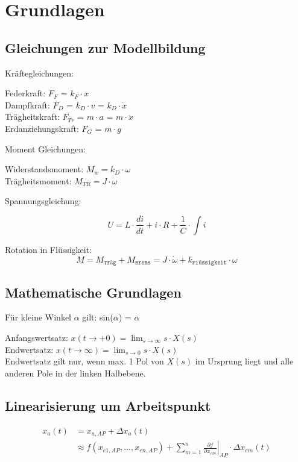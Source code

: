\section{Grundlagen}

\subsection{Gleichungen zur Modellbildung}
	Kräftegleichungen:
	\begin{mdframed}[style=exercise]
		Federkraft: \(F_F\) = \(k_F \cdot x\)\\
		Dampfkraft: \(F_D\) = \(k_D \cdot v\) = \(k_D \cdot \dot{x}\)\\
		Trägheitskraft: \(F_{Tr}\) = \(m\cdot a\) = \(m\cdot \ddot{x}\)\\
		Erdanziehungskraft: \(F_G\) = \(m\cdot g\)
	\end{mdframed}
	Moment Gleichungen:
	\begin{mdframed}[style=exercise]
		Widerstandsmoment: \(M_w = k_D \cdot \omega\)\\
		Trägheitsmoment: \(M_{TR} = J \cdot \dot{\omega}\)
	\end{mdframed}
	Spannungsgleichung:
	\begin{mdframed}[style=exercise]
		\[
			U = L\cdot \frac{di}{dt}+i\cdot R+\frac{1}{C} \cdot \int i
		\]
	\end{mdframed}

	Rotation in Flüssigkeit:
	\[
		M=M_{\texttt{Träg}}+M_{\texttt{Brems}}=J \cdot \dot{\omega} +k_{\texttt{Flüssigkeit}} \cdot \omega
	\]

\subsection{Mathematische Grundlagen}
	Für kleine Winkel \(\alpha\) gilt: sin(\(\alpha\)) = \(\alpha\)
	\begin{mdframed}[style=exercise]
		Anfangswertsatz: \(x(t \rightarrow +0)=\lim _{s \rightarrow \infty} s \cdot X(s)\)\\
		Endwertsatz: \(x(t \rightarrow \infty)=\lim _{s \rightarrow 0} s \cdot X(s)\)\\
		{\footnotesize Endwertsatz gilt nur, wenn max. 1 Pol von \(X(s)\) im Ursprung liegt und alle anderen Pole in der linken Halbebene.}	
	\end{mdframed}
	

\subsection{Linearisierung um Arbeitspunkt}
	\begin{align*}
		x_{a}(t) &= x_{a,AP} + \Delta x_{a}(t) \\ 
		&\approx f(x_{e1,AP}, ..., x_{en,AP}) + \sum_{m=1}^{n} \left. \frac{\partial f}{\partial x_{em}} \right|_{AP} \cdot \Delta x_{em}(t)
	\end{align*}

